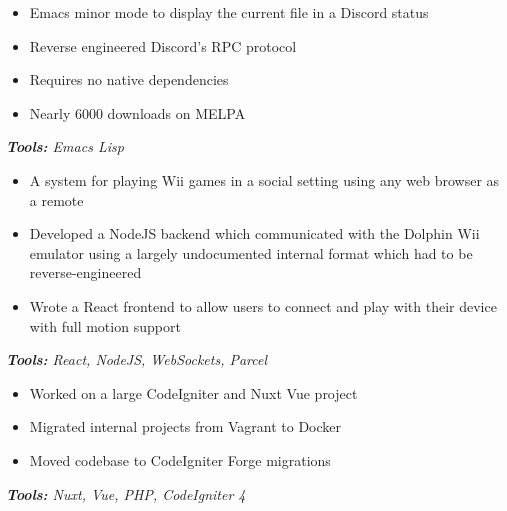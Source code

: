 \documentclass[10pt,letter]{altacv}
\begin{document}
\divider

\begin{itemize}
\item Emacs minor mode to display the current file in a Discord status
\item Reverse engineered Discord's RPC protocol
\item Requires no native dependencies
\item Nearly 6000 downloads on MELPA
\end{itemize}
\textit{\textbf{Tools:} Emacs Lisp}

\divider

\begin{itemize}
\item A system for playing Wii games in a social setting using any web browser as a remote
\item Developed a NodeJS backend which communicated with the Dolphin Wii emulator using a largely undocumented internal format which had to be reverse-engineered
\item Wrote a React frontend to allow users to connect and play with their device with full motion support
\end{itemize}
\textit{\textbf{Tools:} React, NodeJS, WebSockets, Parcel}


\smallskip 


\begin{itemize}
  \item Worked on a large CodeIgniter and Nuxt Vue project
  \item Migrated internal projects from Vagrant to Docker
  \item Moved codebase to CodeIgniter Forge migrations
\end{itemize}
\textit{\textbf{Tools:} Nuxt, Vue, PHP, CodeIgniter 4}

\clearpage
\end{document}
